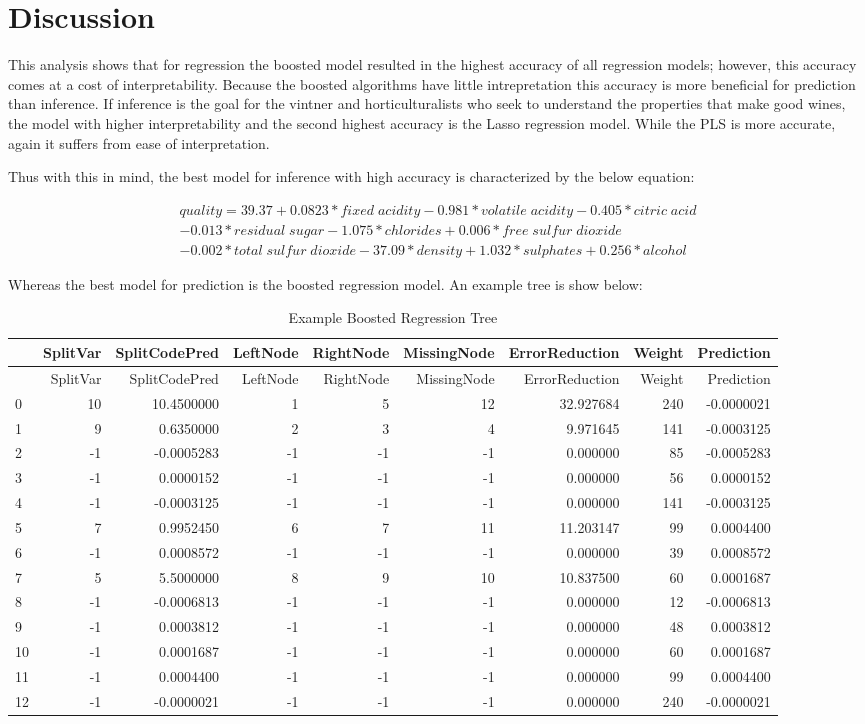 \documentclass[]{article}
\begin{document}
\section{Discussion}\label{discussion}

This analysis shows that for regression the boosted model resulted in
the highest accuracy of all regression models; however, this accuracy
comes at a cost of interpretability. Because the boosted algorithms have
little intrepretation this accuracy is more beneficial for prediction
than inference. If inference is the goal for the vintner and
horticulturalists who seek to understand the properties that make good
wines, the model with higher interpretability and the second highest
accuracy is the Lasso regression model. While the PLS is more accurate,
again it suffers from ease of interpretation.

Thus with this in mind, the best model for inference with high accuracy
is characterized by the below equation:

\begin{equation}
\begin{aligned}
\label{lasso_eq}
quality = 39.37 + 0.0823 * fixed\;acidity -0.981 * volatile\;acidity -0.405 * citric\;acid \\
-0.013 *residual\;sugar -1.075 * chlorides + 0.006 * free\;sulfur\;dioxide\\
- 0.002 * total\;sulfur\;dioxide - 37.09 * density +1.032 * sulphates + 0.256 * alcohol
\end{aligned}
\end{equation}

Whereas the best model for prediction is the boosted regression model.
An example tree is show below:

\begin{longtable}[]{@{}lrrrrrrrr@{}}
\caption{Example Boosted Regression Tree}\tabularnewline
\toprule
& SplitVar & SplitCodePred & LeftNode & RightNode & MissingNode &
ErrorReduction & Weight & Prediction\tabularnewline
\midrule
\endfirsthead
\toprule
& SplitVar & SplitCodePred & LeftNode & RightNode & MissingNode &
ErrorReduction & Weight & Prediction\tabularnewline
\midrule
\endhead
0 & 10 & 10.4500000 & 1 & 5 & 12 & 32.927684 & 240 &
-0.0000021\tabularnewline
1 & 9 & 0.6350000 & 2 & 3 & 4 & 9.971645 & 141 &
-0.0003125\tabularnewline
2 & -1 & -0.0005283 & -1 & -1 & -1 & 0.000000 & 85 &
-0.0005283\tabularnewline
3 & -1 & 0.0000152 & -1 & -1 & -1 & 0.000000 & 56 &
0.0000152\tabularnewline
4 & -1 & -0.0003125 & -1 & -1 & -1 & 0.000000 & 141 &
-0.0003125\tabularnewline
5 & 7 & 0.9952450 & 6 & 7 & 11 & 11.203147 & 99 &
0.0004400\tabularnewline
6 & -1 & 0.0008572 & -1 & -1 & -1 & 0.000000 & 39 &
0.0008572\tabularnewline
7 & 5 & 5.5000000 & 8 & 9 & 10 & 10.837500 & 60 &
0.0001687\tabularnewline
8 & -1 & -0.0006813 & -1 & -1 & -1 & 0.000000 & 12 &
-0.0006813\tabularnewline
9 & -1 & 0.0003812 & -1 & -1 & -1 & 0.000000 & 48 &
0.0003812\tabularnewline
10 & -1 & 0.0001687 & -1 & -1 & -1 & 0.000000 & 60 &
0.0001687\tabularnewline
11 & -1 & 0.0004400 & -1 & -1 & -1 & 0.000000 & 99 &
0.0004400\tabularnewline
12 & -1 & -0.0000021 & -1 & -1 & -1 & 0.000000 & 240 &
-0.0000021\tabularnewline
\bottomrule
\end{longtable}
\end{document}
